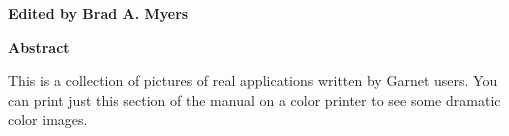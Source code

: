 \begin{titlepage}
\begin{titlebox}
\vspace{0.6 inch}

{\bf Edited by
Brad A. Myers}
\vspace{0.3 line}
\value{date}
\end{titlebox}
\vspace{0.5 inch}
\begin{center}
{\bf Abstract}\end{center}
\begin{text}
This is a collection of pictures of real applications written by Garnet users.
You can print just this section of the manual on a color printer to see some
dramatic color images.

\vspace{0.5 inch}

\end{text}
\end{titlepage}






